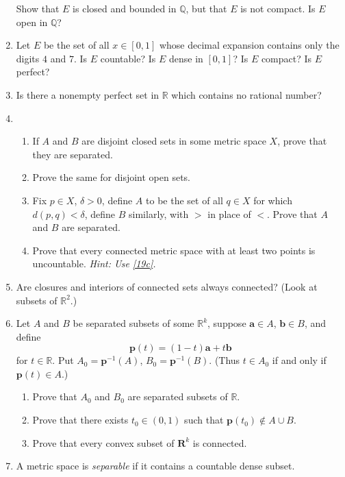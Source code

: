 \begin{enumerate}
  Show that \(E\) is closed and bounded in \(\mathbb{Q}\), but that \(E\) is
  not compact.
  Is \(E\) open in \(\mathbb{Q}\)?
\item
  Let \(E\) be the set of all \(x\in[0, 1]\) whose decimal expansion contains
  only the digits \(4\) and \(7\).
  Is \(E\) countable?
  Is \(E\) dense in \([0, 1]\)?
  Is \(E\) compact?
  Is \(E\) perfect?
\item
  Is there a nonempty perfect set in \(\mathbb{R}\) which contains no rational
  number?
\item
  \begin{enumerate}[label = (\alph*), ref = \theenumi{} (\alph*)]
  \item
    If \(A\) and \(B\) are disjoint closed sets in some metric space \(X\),
    prove that they are separated.
  \item
    Prove the same for disjoint open sets.
  \item
    \label{19c}
    Fix \(p\in X\), \(\delta > 0\), define \(A\) to be the set of all
    \(q\in X\) for which \(d(p, q) < \delta\), define \(B\) similarly, with
    \(>\) in place of \(<\).
    Prove that \(A\) and \(B\) are separated.
  \item
    Prove that every connected metric space with at least two points is
    uncountable.
    \textit{Hint: Use \cref{19c}.}
  \end{enumerate}
\item
  Are closures and interiors of connected sets always connected?
  (Look at subsets of \(\mathbb{R}^2\).)
\item
  Let \(A\) and \(B\) be separated subsets of some \(\mathbb{R}^k\), suppose
  \(\mathbold{a}\in A\), \(\mathbold{b}\in B\), and define
  \[
  \mathbold{p}(t) = (1 - t)\mathbold{a} + t\mathbold{b}
  \]
  for \(t\in\mathbb{R}\).
  Put \(A_0 = \mathbold{p}^{-1}(A)\), \(B_0 = \mathbold{p}^{-1}(B)\).
  (Thus \(t\in A_0\) if and only if \(\mathbold{p}(t)\in A\).)
  \begin{enumerate}[label = (\alph*)]
  \item
    Prove that \(A_0\) and \(B_0\) are separated subsets of \(\mathbb{R}\).
  \item
    Prove that there exists \(t_0\in (0, 1)\) such that
    \(\mathbold{p}(t_0)\not\in A\cup B\).
  \item
    Prove that every convex subset of \(\mathbold{R}^k\) is connected.
  \end{enumerate}
\item
  A metric space is \textit{separable} if it contains a countable dense subset.

\end{enumerate}
